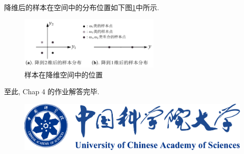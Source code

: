 \documentclass{article}
\begin{document}
\begin{homeworkProblem}
\begin{align}
	\end{align}
	降维后的样本在空间中的分布位置如下图\ref{fig:样本在降维空间中的位置}中所示.
	\begin{figure}[H]  %
		\centering
		\includegraphics[width=0.6\textwidth]{images/title/样本在降维空间中的位置.pdf}
		\caption{样本在降维空间中的位置}
		\label{fig:样本在降维空间中的位置}
	\end{figure}
	至此, Chap 4 的作业解答完毕.

	\vspace{3cm}

	\begin{figure}[H]  %
		\centering
		\includegraphics[width=0.6\linewidth]{images/title/ucas_logo 1.pdf}
		\label{fig:ucas-logo}
	\end{figure}
\end{homeworkProblem}

%
\end{document}

